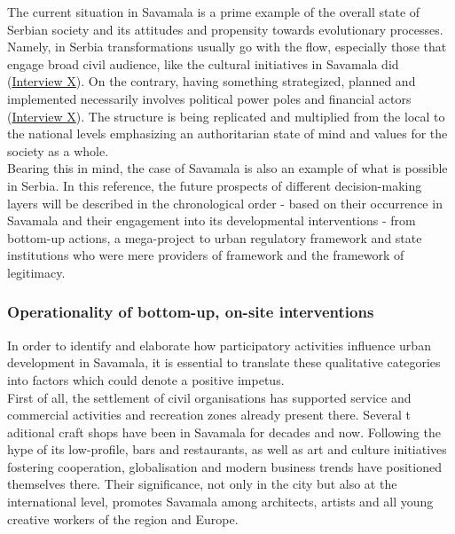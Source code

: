 \documentclass[11pt]{report}
\begin{document}
The current situation in Savamala is a prime example of the overall state of Serbian society and its attitudes and propensity towards evolutionary processes.
Namely, in Serbia transformations usually go with the flow, especially those that engage broad civil audience, like the cultural initiatives in Savamala did
(\href{InterviewX}{Interview X}).
On the contrary, having something strategized, planned and implemented necessarily involves political power poles and financial actors (\href{InterviewX}{Interview X}).
The structure is being replicated and multiplied from the local to the national levels emphasizing an authoritarian state of mind and values for the society as a whole.
\\

Bearing this in mind, the case of Savamala is also an example of what is possible in Serbia. In this reference, the future prospects of different decision-making layers will be described in the chronological order - based on their occurrence in Savamala and their engagement into its developmental interventions - from bottom-up actions, a mega-project to urban regulatory framework and state institutions who were mere providers of framework and the framework of legitimacy. 

\subsubsection{Operationality of bottom-up, on-site interventions}

In order to identify and elaborate how participatory activities influence urban development in Savamala, it is essential to translate these qualitative categories into factors which could denote a positive impetus.
\\

First of all, the settlement of civil organisations has supported service and commercial activities and recreation zones already present there. Several t
aditional craft shops have been in Savamala for decades and now. Following the hype of its low-profile, bars and restaurants, as well as art and culture initiatives fostering cooperation, globalisation and modern business trends have positioned themselves there.
Their significance, not only in the city but also at the international level, promotes Savamala among architects, artists and all young creative workers of the region and Europe.
\\
\end{document}
